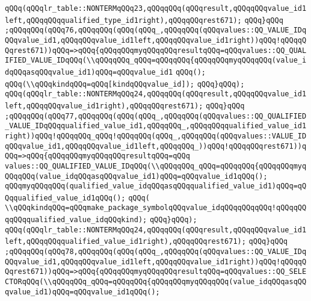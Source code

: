 \verb|qQQq(qQQqlr_table::NONTERMqQQq23,qQQqqQQq(qQQqresult,qQQqqQQqvalue_id1left,qQQqqQQqqualified_type_id1right),qQQqqQQqrest671);|\newline
\verb|qQQq}qQQq|\newline
\verb|;qQQqqQQq(qQQq76,qQQqqQQq(qQQq(qQQq_,qQQqqQQq(qQQqvalues::QQ_VALUE_IDqQQqvalue_id1,qQQqqQQqvalue_id1left,qQQqqQQqvalue_id1right))qQQq!qQQqqQQqrest671))qQQq=>qQQq{qQQqqQQqmyqQQqqQQqresultqQQq=qQQqvalues::QQ_QUALIFIED_VALUE_IDqQQq(\\qQQqqQQq_qQQq=qQQqqQQq{qQQqqQQqmyqQQqqQQq(value_idqQQqasqQQqvalue_id1)qQQq=qQQqvalue_id1|\newline
\verb|qQQq();|\newline
\verb|qQQq(\\qQQqkindqQQq=qQQq[kindqQQqvalue_id]);|\newline
\verb|qQQq}qQQq);|\newline
\verb|qQQq(qQQqlr_table::NONTERMqQQq24,qQQqqQQq(qQQqresult,qQQqqQQqvalue_id1left,qQQqqQQqvalue_id1right),qQQqqQQqrest671);|\newline
\verb|qQQq}qQQq|\newline
\verb|;qQQqqQQq(qQQq77,qQQqqQQq(qQQq(qQQq_,qQQqqQQq(qQQqvalues::QQ_QUALIFIED_VALUE_IDqQQqqualified_value_id1,qQQqqQQq_,qQQqqQQqqualified_value_id1right))qQQq!qQQqqQQq_qQQq!qQQqqQQq(qQQq_,qQQqqQQq(qQQqvalues::VALUE_IDqQQqvalue_id1,qQQqqQQqvalue_id1left,qQQqqQQq_))qQQq!qQQqqQQqrest671))qQQq=>qQQq{qQQqqQQqmyqQQqqQQqresultqQQq=qQQq|\newline
\verb|values::QQ_QUALIFIED_VALUE_IDqQQq(\\qQQqqQQq_qQQq=qQQqqQQq{qQQqqQQqmyqQQqqQQq(value_idqQQqasqQQqvalue_id1)qQQq=qQQqvalue_id1qQQq();|\newline
\verb|qQQqmyqQQqqQQq(qualified_value_idqQQqasqQQqqualified_value_id1)qQQq=qQQqqualified_value_id1qQQq();|\newline
\verb|qQQq(|\newline
\verb|\\qQQqkindqQQq=qQQqmake_package_symbolqQQqvalue_idqQQqqQQqqQQq!qQQqqQQqqQQqqualified_value_idqQQqkind);|\newline
\verb|qQQq}qQQq);|\newline
\verb|qQQq(qQQqlr_table::NONTERMqQQq24,qQQqqQQq(qQQqresult,qQQqqQQqvalue_id1left,qQQqqQQqqualified_value_id1right),qQQqqQQqrest671);|\newline
\verb|qQQq}qQQq|\newline
\verb|;qQQqqQQq(qQQq78,qQQqqQQq(qQQq(qQQq_,qQQqqQQq(qQQqvalues::QQ_VALUE_IDqQQqvalue_id1,qQQqqQQqvalue_id1left,qQQqqQQqvalue_id1right))qQQq!qQQqqQQqrest671))qQQq=>qQQq{qQQqqQQqmyqQQqqQQqresultqQQq=qQQqvalues::QQ_SELECTORqQQq(\\qQQqqQQq_qQQq=qQQqqQQq{qQQqqQQqmyqQQqqQQq(value_idqQQqasqQQqvalue_id1)qQQq=qQQqvalue_id1qQQq();|\newline
